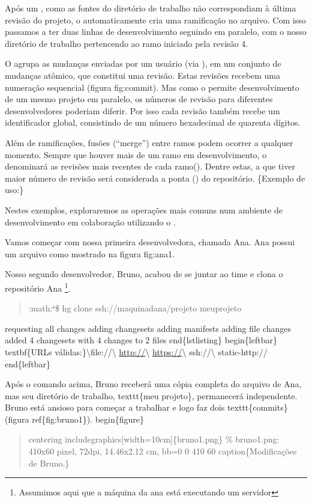 \documentclass[a4paper,10pt,brazil]{sphinxmanual}
\begin{document}
Após um , como as fontes do diretório de trabalho não
correspondiam à última revisão do projeto, o 
automaticamente cria uma ramificação no arquivo. Com isso passamos
a ter duas linhas de desenvolvimento seguindo em paralelo, com o
nosso diretório de trabalho pertencendo ao ramo iniciado pela
revisão 4.

O  agrupa as mudanças enviadas por um usuário (via
), em um conjunto de mudanças atômico, que constitui uma
revisão. Estas revisões recebem uma numeração sequencial (figura
fig:commit). Mas como o  permite desenvolvimento de um
mesmo projeto em paralelo, os números de revisão para diferentes
desenvolvedores poderiam diferir. Por isso cada revisão também
recebe um identificador global, consistindo de um número
hexadecimal de quarenta dígitos.

Além de ramificações, fusões (``merge'') entre ramos podem ocorrer a
qualquer momento. Sempre que houver mais de um ramo em
desenvolvimento, o  denominará as revisões mais
recentes de cada ramo(). Dentre estas, a que
tiver maior número de revisão será considerada a ponta () do
repositório. \{Exemplo de uso:\}

Nestes exemplos, exploraremos as operações mais comuns num ambiente
de desenvolvimento em colaboração utilizando o .

Vamos começar com nossa primeira desenvolvedora, chamada Ana. Ana
possui um arquivo como mostrado na figura fig:ana1.

Nosso segundo desenvolvedor, Bruno, acabou de se juntar ao time e
clona o repositório Ana \footnote{
Assumimos aqui que a máquina da ana está executando um servidor
}.
\begin{quote}

:math:{\color{red}\bfseries{}{}`}\$ hg clone ssh://maquinadana/projeto meuprojeto
\end{quote}

requesting all changes
adding changesets
adding manifests
adding file changes
added 4 changesets with 4 changes to 2 files
end\{lstlisting\}
begin\{leftbar\}
textbf\{URLs válidas:\}\textbackslash{}file://\textbackslash{} \href{http://}{http://}\textbackslash{} \href{https://}{https://}\textbackslash{} ssh://\textbackslash{} static-http://
end\{leftbar\}

Após o comando acima, Bruno receberá uma cópia completa do arquivo de Ana, mas seu diretório de trabalho, texttt\{meu projeto\}, permanecerá independente. Bruno está ansioso para começar a trabalhar e logo faz dois texttt\{commits\} (figura ref\{fig:bruno1\}).
begin\{figure\}
\begin{quote}

centering
includegraphics{[}width=10cm{]}\{bruno1.png\}
\% bruno1.png: 410x60 pixel, 72dpi, 14.46x2.12 cm, bb=0 0 410 60
caption\{Modificações de Bruno.\}
\end{quote}
\end{document}
